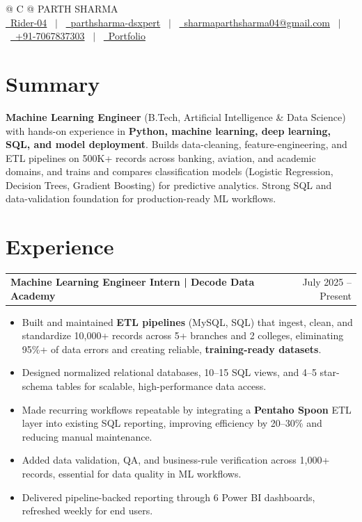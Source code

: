 \documentclass[a4paper,12pt]{article}
\makeatletter
\newenvironment{joblong}[2]
    {
    \begin{tabularx}{\linewidth}{@{}l X r@{}}
    \textbf{#1} & \hfill &  #2 \\[3.75pt]
    \end{tabularx}
    \begin{minipage}[t]{\linewidth}
    \begin{itemize}[nosep,after=\strut, leftmargin=1em, itemsep=3pt,label=--]
    }
    {
    \end{itemize}
    \end{minipage}
    }
\makeatother
\begin{document}
\pagestyle{empty}

\begin{tabularx}{\linewidth}{@{} C @{}}
\Huge{PARTH SHARMA} \\[7.5pt]
\href{https://github.com/Rider-04}{\raisebox{-0.05\height}\faGithub\ Rider-04} \ $|$ \
\href{https://www.linkedin.com/in/parthsharma-dsxpert}{\raisebox{-0.05\height}\faLinkedin\ parthsharma-dsxpert} \ $|$ \
\href{mailto:sharmaparthsharma04@gmail.com}{\raisebox{-0.05\height}\faEnvelope \ sharmaparthsharma04@gmail.com} \ $|$ \
\href{tel:+917067837303}{\raisebox{-0.05\height}\faMobile \ +91-7067837303} \ $|$ \
\href{https://parth-portfolio-virid.vercel.app/}{\raisebox{-0.05\height}\faGlobe \ Portfolio}\end{tabularx}


\section{Summary}
\textbf{Machine Learning Engineer} (B.Tech, Artificial Intelligence \& Data Science) with hands-on experience in \textbf{Python, machine learning, deep learning, SQL, and model deployment}. Builds data-cleaning, feature-engineering, and ETL pipelines on 500K+ records across banking, aviation, and academic domains, and trains and compares classification models (Logistic Regression, Decision Trees, Gradient Boosting) for predictive analytics. Strong SQL and data-validation foundation for production-ready ML workflows.

\section{Experience}

\begin{joblong}{Machine Learning Engineer Intern | Decode Data Academy}{July 2025 -- Present}
\item Built and maintained \textbf{ETL pipelines} (MySQL, SQL) that ingest, clean, and standardize 10,000+ records across 5+ branches and 2 colleges, eliminating 95\%+ of data errors and creating reliable, \textbf{training-ready datasets}.
\item Designed normalized relational databases, 10--15 SQL views, and 4--5 star-schema tables for scalable, high-performance data access.
\item Made recurring workflows repeatable by integrating a \textbf{Pentaho Spoon} ETL layer into existing SQL reporting, improving efficiency by 20--30\% and reducing manual maintenance.
\item Added data validation, QA, and business-rule verification across 1,000+ records, essential for data quality in ML workflows.
\item Delivered pipeline-backed reporting through 6 Power BI dashboards, refreshed weekly for end users.
\vspace{10pt}
\end{joblong}
\end{document}
